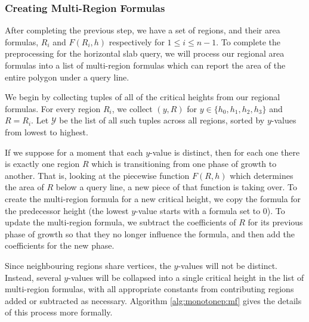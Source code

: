 \subsubsection{Creating Multi-Region Formulas}
\label{sec:mr_formula}

After completing the previous step, we have a set of regions, and their area 
formulas, $R_i$ and $F(R_i, h)$ respectively for $1 \leq i \leq n-1$.
To complete the preprocessing for the horizontal slab query, we will process our 
regional area formulas into a list of multi-region formulas which can report the 
area of the entire polygon under a query line.

We begin by collecting tuples of all of the critical heights from our regional 
formulas. 
For every region $R_i$, we collect $(y, R)$ for $y \in \{h_0, h_1, h_2, h_3\}$ 
and $R = R_i$.
Let $\mathcal{Y}$ be the list of all such tuples across all regions, sorted by 
$y$-values from lowest to highest.

If we suppose for a moment that each $y$-value is distinct, then for each one 
there is exactly one region $R$ which is transitioning from one phase of growth 
to another.
That is, looking at the piecewise function $F(R, h)$ which determines the area 
of $R$ below a query line, a new piece of that function is taking over.
To create the multi-region formula for a new critical height, we copy the 
formula for the predecessor height (the lowest $y$-value starts with a formula 
set to 0).
To update the multi-region formula, we subtract the coefficients of $R$ for its 
previous phase of growth so that they no longer influence the formula, and then 
add the coefficients for the new phase.

Since neighbouring regions share vertices, the $y$-values will not be distinct.
Instead, several $y$-values will be collapsed into a single critical height in 
the list of multi-region formulas, with all appropriate constants from 
contributing regions added or subtracted as necessary.
Algorithm \ref{alg:monotonep:mf} gives the details of this process more 
formally.

